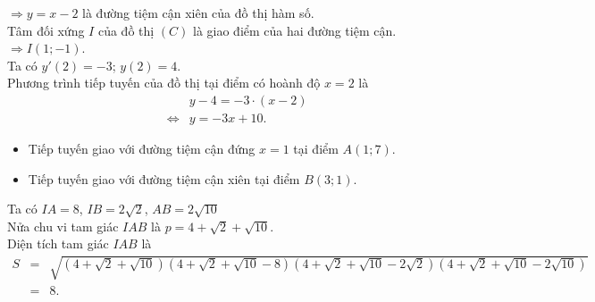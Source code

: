 \begin{ex}
{\begin{itemchoice}
			$\Rightarrow y=x-2$ là đường  tiệm cận xiên của đồ thị hàm số. \\
			Tâm đối xứng $I$ của đồ thị $(C)$ là giao điểm của hai đường tiệm cận. \\ 
			 $\Rightarrow I(1;-1)$. \\
			Ta có $y'(2) = -3$; $y(2) =  4$. \\
			Phương trình tiếp tuyến của đồ thị tại điểm  có hoành độ $x=2$ là
			\begin{eqnarray*}
				&&y-4=-3 \cdot (x-2)\\ 
				&\Leftrightarrow&y=-3x+10. 
			\end{eqnarray*}
			\begin{itemize}
				\item Tiếp tuyến  giao với đường tiệm cận đứng $x=1$ tại điểm $A(1;7)$.
				\item Tiếp tuyến giao với đường tiệm  cận xiên tại điểm $B(3;1)$.
			\end{itemize}
			 Ta có $IA=8$, $IB=2\sqrt{2}$, $AB=2\sqrt{10}$ \\
			Nửa chu vi tam giác $IAB$ là  $p=4+\sqrt{2}+\sqrt{10}$. \\
			Diện tích tam giác $IAB$  là
			\begin{eqnarray*}
				S&=&\sqrt{(4+\sqrt{2}+\sqrt{10})(4+\sqrt{2}+\sqrt{10}-8)(4+\sqrt{2}+\sqrt{10}-2\sqrt{2})(4+\sqrt{2}+\sqrt{10}-2\sqrt{10})} \\ 
				&=& 8. 
			\end{eqnarray*}
		\end{itemchoice}
	 }
\end{ex}

